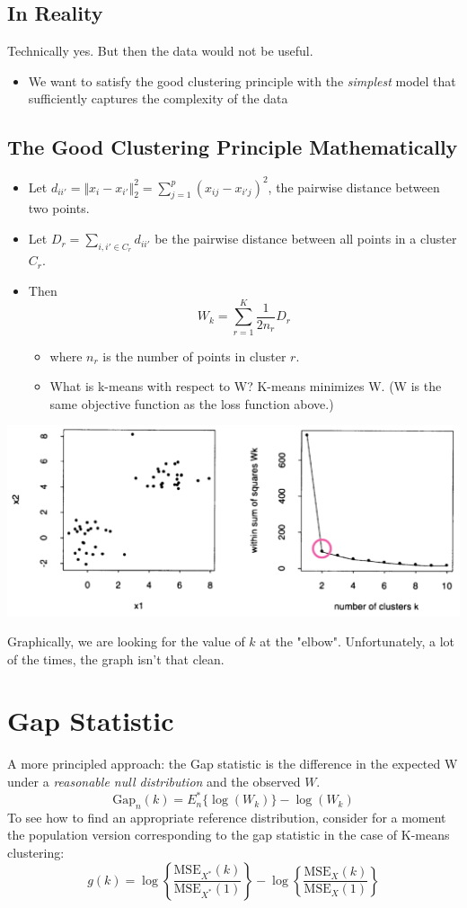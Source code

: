 \documentclass[10pt]{article}
\begin{document}
\subsection*{In Reality}
Technically yes.  But then the data would not be useful.
\begin{itemize}
    \item We want to satisfy the good clustering principle with the \textit{simplest} model that sufficiently captures the complexity of the data
\end{itemize}

\subsection*{The Good Clustering Principle Mathematically}
\begin{itemize}
    \item Let $d_{ii'} = \Vert x_i - x_{i'} \Vert_2^2 = \sum_{j = 1}^p (x_{ij} - x_{i'j})^2$, the pairwise distance between two points.
    \item Let $D_r = \sum_{i, i' \in C_r} d_{ii'}$ be the pairwise distance between all points in a cluster $C_r$.
    \item Then
    \[W_k = \sum_{r = 1}^K \frac{1}{2n_r} D_r\]
    \begin{itemize}
        \item where $n_r$ is the number of points in cluster $r$.
        \item What is k-means with respect to W?  K-means minimizes W.  (W is the same objective function as the loss function above.)
    \end{itemize}
\end{itemize}
\begin{center}
    \includegraphics*[scale=0.5]{W8_5.png}
\end{center}
Graphically, we are looking for the value of $k$ at the "elbow".  Unfortunately, a lot of the times, the graph isn't that clean.

\section*{Gap Statistic}
A more principled approach: the Gap statistic is the difference in the expected W under a \textit{reasonable null distribution} and the observed $W$.
\[\text{Gap}_n(k) = E_n^* \{\log(W_k)\} - \log(W_k)\]
To see how to find an appropriate reference distribution, consider for a moment the population version corresponding to the gap statistic in the case of K-means clustering:
\[g(k) = \log\left\{ \frac{\text{MSE}_{X^*}(k)}{\text{MSE}_{X^*}(1)}\right\} - \log\left\{ \frac{\text{MSE}_{X}(k)}{\text{MSE}_{X}(1)}\right\}\]
\end{document}
